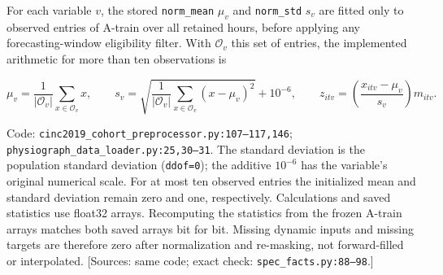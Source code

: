 For each variable \(v\), the stored \texttt{norm\_\allowbreak{}mean} \(\mu_v\) and \texttt{norm\_\allowbreak{}std} \(s_v\) are fitted only to observed entries of A-train over all retained hours, before applying any forecasting-window eligibility filter. With \(\mathcal O_v\) this set of entries, the implemented arithmetic for more than ten observations is

\[
\mu_v=\frac{1}{|\mathcal O_v|}\sum_{x\in\mathcal O_v}x,
\qquad s_v=\sqrt{\frac{1}{|\mathcal O_v|}\sum_{x\in\mathcal O_v}(x-\mu_v)^2}+10^{-6},
\qquad z_{itv}=\left(\frac{x_{itv}-\mu_v}{s_v}\right)m_{itv}.
\]


Code: \texttt{cinc2019\_\allowbreak{}cohort\_\allowbreak{}preprocessor.\allowbreak{}py:\allowbreak{}107–\allowbreak{}117,\allowbreak{}146}; \texttt{physiograph\_\allowbreak{}data\_\allowbreak{}loader.\allowbreak{}py:\allowbreak{}25,\allowbreak{}30–\allowbreak{}31}. The standard deviation is the population standard deviation (\texttt{ddof=\allowbreak{}0}); the additive \(10^{-6}\) has the variable's original numerical scale. For at most ten observed entries the initialized mean and standard deviation remain zero and one, respectively. Calculations and saved statistics use float32 arrays. Recomputing the statistics from the frozen A-train arrays matches both saved arrays bit for bit. Missing dynamic inputs and missing targets are therefore zero after normalization and re-masking, not forward-filled or interpolated. [Sources: same code; exact check: \texttt{spec\_\allowbreak{}facts.\allowbreak{}py:\allowbreak{}88–\allowbreak{}98}.]

